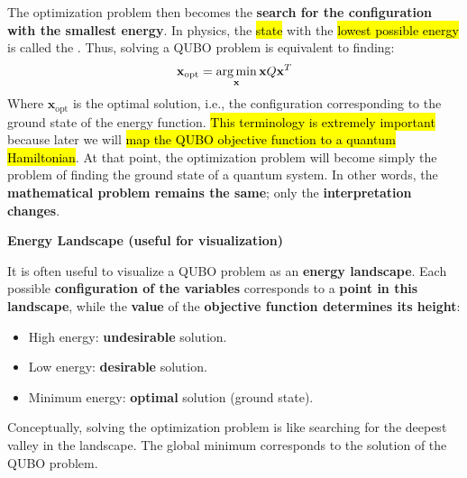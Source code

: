 \noindent
The optimization problem then becomes the \textbf{search for the configuration with the smallest energy}. In physics, the \hl{state} with the \hl{lowest possible energy} is called the . Thus, solving a QUBO problem is equivalent to finding:
\begin{equation*}
    \mathbf{x}_{\text{opt}} = \operatorname*{arg\,min}_{\mathbf{x}} \mathbf{x} Q \mathbf{x}^T
\end{equation*}
Where $\mathbf{x}_{\text{opt}}$ is the optimal solution, i.e., the configuration corresponding to the ground state of the energy function. \hl{This terminology is extremely important} because later we will \hl{map the QUBO objective function to a quantum Hamiltonian}. At that point, the optimization problem will become simply the problem of finding the ground state of a quantum system. In other words, the \textbf{mathematical problem remains the same}; only the \textbf{interpretation changes}.

\highspace
\begin{flushleft}
    \textcolor{Green3}{ \textbf{Energy Landscape (useful for visualization)}}
\end{flushleft}
It is often useful to visualize a QUBO problem as an \textbf{energy landscape}. Each possible \textbf{configuration of the variables} corresponds to a \textbf{point in this landscape}, while the \textbf{value} of the \textbf{objective function determines its height}:
\begin{itemize}
    \item[\textcolor{Red2}{\faIcon{times}}] High energy: \textbf{undesirable} solution.
    \item[\textcolor{DarkOrange3}{\faIcon{balance-scale}}] Low energy: \textbf{desirable} solution.
    \item[\textcolor{Green3}{\faIcon{check}}] Minimum energy: \textbf{optimal} solution (ground state).
\end{itemize}
Conceptually, solving the optimization problem is like searching for the deepest valley in the landscape. The global minimum corresponds to the solution of the QUBO problem.

